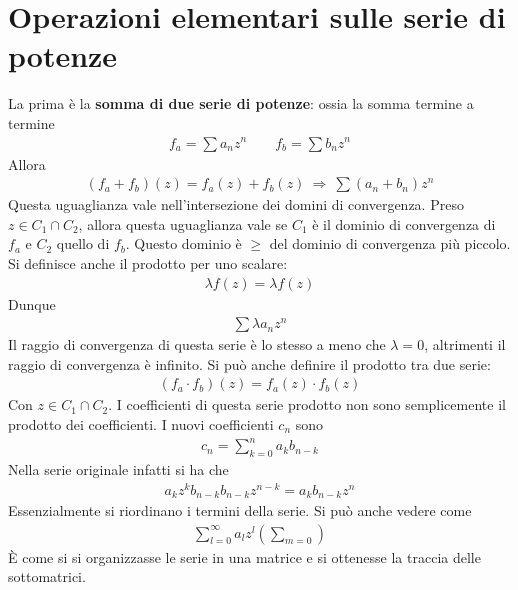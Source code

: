 \documentclass[a4paper, oneside]{article}
\begin{document}
\section{Operazioni elementari sulle serie di potenze}
La prima è la \textbf{somma di due serie di potenze}: ossia la somma termine a termine
\begin{gather*}
    f_a = \sum a_n z^{n} \qquad f_b = \sum b_nz^{n}
\end{gather*}
Allora 
\begin{gather*}
    (f_a + f_b)(z) = f_a(z) + f_b(z) \ \Longrightarrow \ \sum (a_n + b_n)z^{n}
\end{gather*}
Questa uguaglianza vale nell'intersezione dei domini di convergenza. Preso $z \in C_1 \cap C_2$, 
allora questa uguaglianza vale se $C_1$ è il dominio di convergenza di $f_a$ e $C_2$ quello 
di $f_b$. Questo dominio è $\geq$ del dominio di convergenza più piccolo.
Si definisce anche il prodotto per uno scalare:
\begin{gather*}
    \lambda f(z) = \lambda f(z)
\end{gather*}
Dunque
\begin{gather*}
    \sum \lambda a_n z^{n}
\end{gather*}
Il raggio di convergenza di questa serie è lo stesso a meno che $\lambda = 0$, altrimenti 
il raggio di convergenza è infinito. Si può anche definire il prodotto tra due serie:
\begin{gather*}
    (f_a \cdot f_b) (z) = f_a(z) \cdot f_b(z) 
\end{gather*}
Con $z \in C_1 \cap C_2$. I coefficienti di questa serie prodotto non sono 
semplicemente il prodotto dei coefficienti. I nuovi coefficienti $c_n$ sono 
\begin{gather*}
    c_n = \sum_{k = 0}^{n}a_kb_{n - k} 
\end{gather*}
Nella serie originale infatti si ha che
\begin{gather*}
    a_k z^{k} b_{n - k} b_{n - k} z^{n - k} = a_k b_{n - k}z^{n}
\end{gather*}
Essenzialmente si riordinano i termini della serie.  Si può anche vedere
come
\begin{gather*}
    \sum_{l = 0}^{\infty } a_l z^{l} \left(\sum_{m = 0}^{} \right) 
\end{gather*}
È come si si organizzasse le serie in una matrice e si ottenesse la traccia
delle sottomatrici. 
\end{document}
